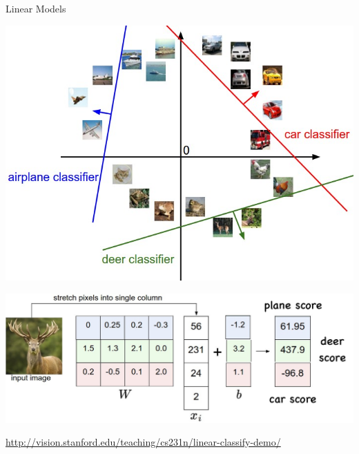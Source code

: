 \documentclass{beamer}
\begin{document}
\begin{frame}{Linear Models}
	\begin{center}
		\includegraphics[scale=0.27]{img/pclf3}
		
		\includegraphics[scale=0.15]{img/clf3}
	\end{center}
	 \href{http://vision.stanford.edu/teaching/cs231n/linear-classify-demo/}{http://vision.stanford.edu/teaching/cs231n/linear-classify-demo/}
\end{frame}
\end{document}

